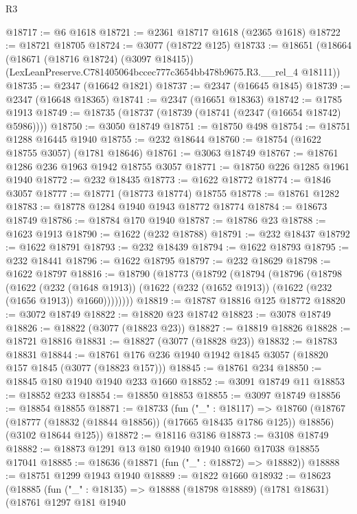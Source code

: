 \begin{lexlean}{R3}
\begin{coremodule}
@18717 := @6 @1618
@18721 := @2361 @18717 @1618 (@2365 @1618)
@18722 := @18721 @18705
@18724 := @3077 (@18722 @125)
@18733 := @18651
    (@18664
      (@18671 (@18716 @18724) (@3097 @18415))
      (LexLeanPreserve.C781405064bccec777c3654bb478b9675.R3.__rel_4 @18111))
@18735 := @2347 (@16642 @1821)
@18737 := @2347 (@16645 @1845)
@18739 := @2347 (@16648 @18365)
@18741 := @2347 (@16651 @18363)
@18742 := @1785 @1913
@18749 := @18735 (@18737 (@18739 (@18741 (@2347 (@16654 @18742) @5986))))
@18750 := @3050 @18749
@18751 := @18750 @498
@18754 := @18751 @1288 @16445 @1940
@18755 := @232 @18644
@18760 := @18754 (@1622 @18755 @3057) (@1781 @18646)
@18761 := @3063 @18749
@18767 := @18761 @1286 @236 @1963 @1942 @18755 @3057
@18771 := @18750 @226 @1285 @1961 @1940
@18772 := @232 @18435
@18773 := @1622 @18772
@18774 := @1846 @3057
@18777 := @18771 (@18773 @18774) @18755
@18778 := @18761 @1282
@18783 := @18778 @1284 @1940 @1943 @18772 @18774
@18784 := @18673 @18749
@18786 := @18784 @170 @1940
@18787 := @18786 @23
@18788 := @1623 @1913
@18790 := @1622 (@232 @18788)
@18791 := @232 @18437
@18792 := @1622 @18791
@18793 := @232 @18439
@18794 := @1622 @18793
@18795 := @232 @18441
@18796 := @1622 @18795
@18797 := @232 @18629
@18798 := @1622 @18797
@18816 := @18790
    (@18773
      (@18792
        (@18794
          (@18796
            (@18798
              (@1622
                (@232 (@1648 @1913))
                (@1622 (@232 (@1652 @1913)) (@1622 (@232 (@1656 @1913)) @1660))))))))
@18819 := @18787 @18816 @125 @18772
@18820 := @3072 @18749
@18822 := @18820 @23 @18742
@18823 := @3078 @18749
@18826 := @18822 (@3077 (@18823 @23))
@18827 := @18819 @18826
@18828 := @18721 @18816
@18831 := @18827 (@3077 (@18828 @23))
@18832 := @18783 @18831
@18844 := @18761 @176 @236 @1940 @1942 @1845 @3057 (@18820 @157 @1845 (@3077 (@18823 @157)))
@18845 := @18761 @234
@18850 := @18845 @180 @1940 @1940 @233 @1660
@18852 := @3091 @18749 @11
@18853 := @18852 @233
@18854 := @18850 @18853
@18855 := @3097 @18749
@18856 := @18854 @18855
@18871 := @18733
    (fun ("_" : @18117) =>
    @18760
      (@18767 (@18777 (@18832 (@18844 @18856)) (@17665 @18435 @1786 @125)) @18856)
      (@3102 @18644 @125))
@18872 := @18116 @3186
@18873 := @3108 @18749
@18882 := @18873 @1291 @13 @180 @1940 @1940 @1660 @17038 @18855 @17041
@18885 := @18636 (@18871 (fun ("_" : @18872) => @18882))
@18888 := @18751 @1299 @1943 @1940
@18889 := @1822 @1660
@18932 := @18623
    (@18885
      (fun ("_" : @18135) =>
      @18888
        (@18798 @18889)
        (@1781 @18631)
        (@18761
          @1297
          @181
          @1940

\end{coremodule}
\end{lexlean}
